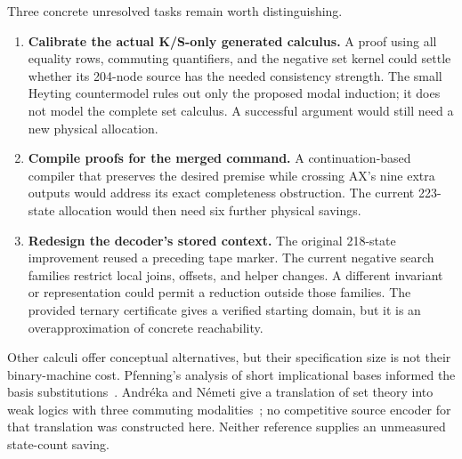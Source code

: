 \documentclass[11pt]{article}
\begin{document}
Three concrete unresolved tasks remain worth distinguishing.
\begin{enumerate}
\item \textbf{Calibrate the actual K/S-only generated calculus.} A proof using
all equality rows, commuting quantifiers, and the negative set kernel could
settle whether its 204-node source has the needed consistency strength.
The small Heyting countermodel rules out only the proposed modal induction;
it does not model the complete set calculus. A successful argument would
still need a new physical allocation.
\item \textbf{Compile proofs for the merged command.} A continuation-based
compiler that preserves the desired premise while crossing AX's nine extra
outputs would address its exact completeness obstruction. The current
223-state allocation would then need six further physical savings.
\item \textbf{Redesign the decoder's stored context.} The original 218-state
improvement reused a preceding tape marker. The current negative search
families restrict local joins, offsets, and helper changes. A different
invariant or representation could permit a reduction outside those families.
The provided ternary certificate gives a verified starting domain, but it
is an overapproximation of concrete reachability.
\end{enumerate}
Other calculi offer conceptual alternatives, but their specification size is
not their binary-machine cost. Pfenning's analysis of short implicational
bases informed the basis substitutions~\cite{pfenning}. Andr\'eka and
N\'emeti give a translation of set theory into weak logics with three
commuting modalities~\cite{andreka}; no competitive source encoder for that
translation was constructed here. Neither reference supplies an unmeasured
state-count saving.
\end{document}
